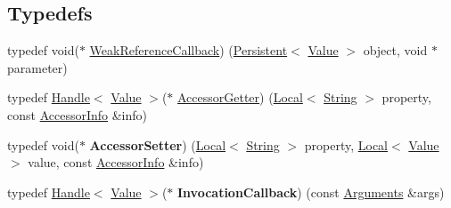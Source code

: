 \subsection*{Typedefs}
\begin{DoxyCompactItemize}
\item 
typedef void($\ast$ \hyperlink{namespacev8_a4d5db775dbc002b23f1b55ec7ce80ea5}{Weak\+Reference\+Callback}) (\hyperlink{classv8_1_1_persistent}{Persistent}$<$ \hyperlink{classv8_1_1_value}{Value} $>$ object, void $\ast$parameter)
\item 
typedef \hyperlink{classv8_1_1_handle}{Handle}$<$ \hyperlink{classv8_1_1_value}{Value} $>$($\ast$ \hyperlink{namespacev8_a3016fe071826349d1370a700e71be094}{Accessor\+Getter}) (\hyperlink{classv8_1_1_local}{Local}$<$ \hyperlink{classv8_1_1_string}{String} $>$ property, const \hyperlink{classv8_1_1_accessor_info}{Accessor\+Info} \&info)
\item 
\hypertarget{namespacev8_a6bf0ccffe563bf71d01828b3512705ed}{}typedef void($\ast$ {\bfseries Accessor\+Setter}) (\hyperlink{classv8_1_1_local}{Local}$<$ \hyperlink{classv8_1_1_string}{String} $>$ property, \hyperlink{classv8_1_1_local}{Local}$<$ \hyperlink{classv8_1_1_value}{Value} $>$ value, const \hyperlink{classv8_1_1_accessor_info}{Accessor\+Info} \&info)\label{namespacev8_a6bf0ccffe563bf71d01828b3512705ed}

\item 
\hypertarget{namespacev8_aa1cc8187a527d2cd85d6e4908c0a0513}{}typedef \hyperlink{classv8_1_1_handle}{Handle}$<$ \hyperlink{classv8_1_1_value}{Value} $>$($\ast$ {\bfseries Invocation\+Callback}) (const \hyperlink{classv8_1_1_arguments}{Arguments} \&args)\label{namespacev8_aa1cc8187a527d2cd85d6e4908c0a0513}


\end{DoxyCompactItemize}
